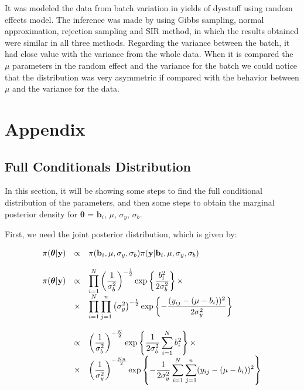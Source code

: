\documentclass{asaproc}
\begin{document}
It was modeled the data from batch variation in yields of dyestuff using random effects model. The inference was made by using Gibbs sampling, normal approximation, rejection sampling and SIR method, in which the results obtained were similar in all three methods. Regarding the variance between the batch, it had close value with the variance from the whole data. When it is compared the $\mu$ parameters in the random effect and the variance for the batch we could notice that the distribution was very asymmetric if compared with the behavior between $\mu$ and the variance for the data. 

\section{Appendix}

\subsection{Full Conditionals Distribution}

In this section, it will be showing some steps to find the full conditional distribution of the parameters, and then some steps to obtain the marginal posterior density for $\boldsymbol{\theta}$ = $\textbf{b}_i$, $\mu$, $\sigma_y$, $\sigma_b$.

First, we need the joint posterior distribution, which is given by:
\begin{small}
\begin{eqnarray*}
\begin{array}{lcl ll }
\pi(\boldsymbol{\theta}|\textbf{y}) & \propto & \pi(\textbf{b}_i,\mu, \sigma_y, \sigma_b)\pi(\textbf{y}|\textbf{b}_i, \mu, \sigma_y, \sigma_b) \\ \\

\pi(\boldsymbol{\theta}|\textbf{y}) & \propto &\displaystyle\prod_{i=1}^{N}  \left(\dfrac{1}{\sigma_b^2}\right)^{-\frac{1}{2}}\mbox{exp}\left\{ \dfrac{ b_i^2}{2\sigma_b^2} \right\} \times \\
& \times & \displaystyle\prod_{i=1}^{N} \displaystyle\prod_{j=1}^{n} \left(\sigma_y^2\right)^{-\frac{1}{2}}\mbox{exp}\left\{ -\dfrac{(y_{ij} - (\mu - b_i))^2}{2\sigma_y^2}\right\} \\ \\

& \propto & \left(\dfrac{1}{\sigma_b^2}\right)^{-\frac{N}{2}}\mbox{exp}\left\{ \dfrac{1}{2\sigma_b^2}\displaystyle\sum_{i=1}^{N} b_i^2 \right\} \times \\ 
& \times  &  \left(\dfrac{1}{\sigma_y^2}\right)^{-\frac{Nn}{2}} \mbox{exp}\left\{ -\dfrac{1}{2\sigma_y^2}\displaystyle\sum_{i=1}^{N}\displaystyle\sum_{j=1}^{n}(y_{ij} - (\mu - b_i))^2\right\}
\end{array}
\end{eqnarray*}
\end{small}
\end{document}

